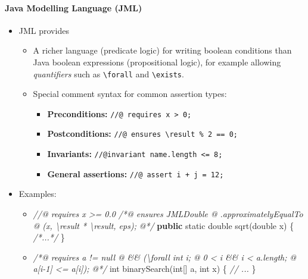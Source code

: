 \documentclass[a4paper]{article}
\newenvironment{Shaded}{}{}
\newcommand{\CommentTok}[1]{\textcolor[rgb]{0.38,0.63,0.69}{\textit{#1}}}
\newcommand{\DataTypeTok}[1]{\textcolor[rgb]{0.56,0.13,0.00}{#1}}
\newcommand{\FunctionTok}[1]{\textcolor[rgb]{0.02,0.16,0.49}{#1}}
\newcommand{\KeywordTok}[1]{\textcolor[rgb]{0.00,0.44,0.13}{\textbf{#1}}}
\newcommand{\NormalTok}[1]{#1}
\providecommand{\tightlist}{%
  \setlength{\itemsep}{0pt}\setlength{\parskip}{0pt}}
\let\oldparagraph\paragraph
\renewcommand{\paragraph}[1]{\oldparagraph{#1}\mbox{}}
\begin{document}
\hypertarget{java-modelling-language-jml}{%
\paragraph{Java Modelling Language
(JML)}\label{java-modelling-language-jml}}

\begin{itemize}
\item
  JML provides

  \begin{itemize}
  \tightlist
  \item
    A richer language (predicate logic) for writing boolean conditions
    than Java boolean expressions (propositional logic), for example
    allowing \emph{quantifiers} such as \texttt{\textbackslash{}forall}
    and \texttt{\textbackslash{}exists}.
  \item
    Special comment syntax for common assertion types:

    \begin{itemize}
    \tightlist
    \item
      \textbf{Preconditions:}
      \texttt{//@\ requires\ x\ \textgreater{}\ 0;}
    \item
      \textbf{Postconditions:}
      \texttt{//@\ ensures\ \textbackslash{}result\ \%\ 2\ ==\ 0;}
    \item
      \textbf{Invariants:}
      \texttt{//@invariant\ name.length\ \textless{}=\ 8;\ }
    \item
      \textbf{General assertions:} \texttt{//@\ assert\ i\ +\ j\ =\ 12;}
    \end{itemize}
  \end{itemize}
\item
  Examples:

  \begin{itemize}
  \item
\begin{Shaded}
\begin{Highlighting}[]
\CommentTok{//@ requires x >= 0.0}
\CommentTok{/*@ ensures JMLDouble}
\CommentTok{  @         .approximatelyEqualTo}
\CommentTok{  @        (x, \textbackslash{}result * \textbackslash{}result, eps);}
\CommentTok{  @*/}
\KeywordTok{public} \DataTypeTok{static} \DataTypeTok{double} \FunctionTok{sqrt}\NormalTok{(}\DataTypeTok{double}\NormalTok{ x) \{}
    \CommentTok{/*...*/}
\NormalTok{\}}
\end{Highlighting}
\end{Shaded}
  \item
\begin{Shaded}
\begin{Highlighting}[]
\CommentTok{/*@ requires a != null}
\CommentTok{  @       && (\textbackslash{}forall int i;}
\CommentTok{  @               0 < i && i < a.length;}
\CommentTok{  @               a[i-1] <= a[i]);}
\CommentTok{  @*/}
\DataTypeTok{int} \FunctionTok{binarySearch}\NormalTok{(}\DataTypeTok{int}\NormalTok{[] a, }\DataTypeTok{int}\NormalTok{ x) \{}
    \CommentTok{// ...}
\NormalTok{\}}
\end{Highlighting}
\end{Shaded}


\end{itemize}
\end{itemize}
\end{document}

